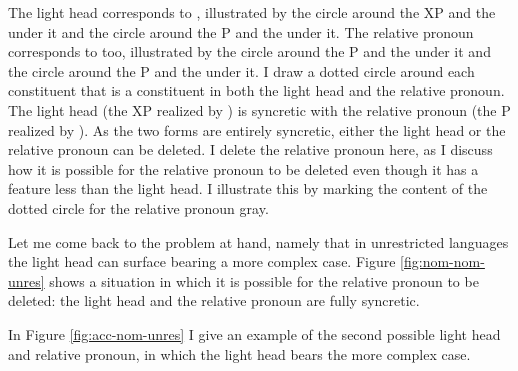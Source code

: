 The light head corresponds to , illustrated by the circle around the XP and the  under it and the circle around the P and the  under it. The relative pronoun corresponds to  too, illustrated by the circle around the P and the  under it and the circle around the P and the  under it.
I draw a dotted circle around each constituent that is a constituent in both the light head and the relative pronoun.
The light head (the XP realized by ) is syncretic with the relative pronoun (the P realized by ).
As the two forms are entirely syncretic, either the light head or the relative pronoun can be deleted. I delete the relative pronoun here, as I discuss how it is possible for the relative pronoun to be deleted even though it has a feature less than the light head.
I illustrate this by marking the content of the dotted circle for the relative pronoun gray.

Let me come back to the problem at hand, namely that in unrestricted languages the light head can surface bearing a more complex case.
Figure \ref{fig:nom-nom-unres} shows a situation in which it is possible for the relative pronoun to be deleted: the light head and the relative pronoun are fully syncretic.

In Figure \ref{fig:acc-nom-unres} I give an example of the second possible light head and relative pronoun, in which the light head bears the more complex case.

